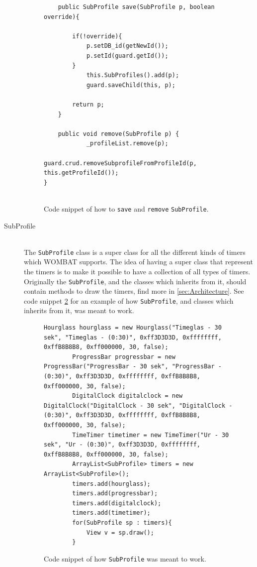 \begin{description}
			\begin{figure}[H]
\begin{lstlisting}
	public SubProfile save(SubProfile p, boolean override){

		if(!override){
			p.setDB_id(getNewId());
			p.setId(guard.getId());
		}
			this.SubProfiles().add(p);
			guard.saveChild(this, p);
			
		return p;
	}

	public void remove(SubProfile p) {
			_profileList.remove(p);
			guard.crud.removeSubprofileFromProfileId(p, this.getProfileId());
}
	
\end{lstlisting}
\caption{Code snippet of how to \texttt{save} and \texttt{remove} \texttt{SubProfile}.}%
\label{code:TimerLibSaveRemove}%
\end{figure}

  \item[SubProfile] \hfill \\
  The \texttt{SubProfile} class is a super class for all the different kinds of timers which WOMBAT supports. The idea of having a super class that represent the timers is to make it possible to have a collection of all types of timers. Originally the \texttt{SubProfile}, and the classes which inherits from it, should contain methods to draw the timers, find more in \autoref{sec:Architecture}. See code snippet \ref{code:subprofileexample} for an example of how \texttt{SubProfile}, and classes which inherits from it, was meant to work.
	
\begin{figure}[H]
\begin{lstlisting}
Hourglass hourglass = new Hourglass("Timeglas - 30 sek", "Timeglas - (0:30)", 0xff3D3D3D, 0xffffffff, 0xffB8B8B8, 0xff000000, 30, false);
		ProgressBar progressbar = new ProgressBar("ProgressBar - 30 sek", "ProgressBar - (0:30)", 0xff3D3D3D, 0xffffffff, 0xffB8B8B8, 0xff000000, 30, false);
		DigitalClock digitalclock = new DigitalClock("DigitalClock - 30 sek", "DigitalClock - (0:30)", 0xff3D3D3D, 0xffffffff, 0xffB8B8B8, 0xff000000, 30, false);
		TimeTimer timetimer = new TimeTimer("Ur - 30 sek", "Ur - (0:30)", 0xff3D3D3D, 0xffffffff, 0xffB8B8B8, 0xff000000, 30, false);
		ArrayList<SubProfile> timers = new ArrayList<SubProfile>();
		timers.add(hourglass);
		timers.add(progressbar);
		timers.add(digitalclock);
		timers.add(timetimer);
		for(SubProfile sp : timers){
			View v = sp.draw();
		}
\end{lstlisting}
\caption{Code snippet of how \texttt{SubProfile} was meant to work.}%
\label{code:subprofileexample}%
\end{figure}
	

\end{description}
